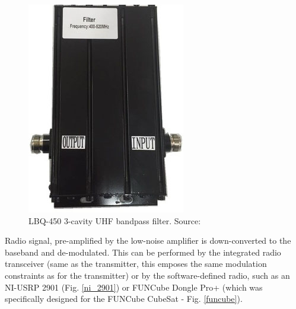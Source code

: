 \begin{minipage}{\linewidth}
\begin{minipage}{0.45\linewidth}
\begin{figure}[H]
            \includegraphics[width=0.2\paperwidth]{img/2/cavity_uhf.jpg}
            \caption{LBQ-450 3-cavity UHF bandpass filter. Source: \cite{cavity_uhf}}
            \label{cavity_uhf}
        \end{figure}
    \end{minipage}
\end{minipage}

Radio signal, pre-amplified by the low-noise amplifier is down-converted to the baseband and de-modulated. This can be performed by the integrated radio transceiver (same as the transmitter, this emposes the same modulation constraints as for the transmitter) or by the software-defined radio, such as an NI-USRP 2901 (Fig. \ref{ni_2901}) or FUNCube Dongle Pro+ (which was specifically designed for the FUNCube CubeSat - Fig. \ref{funcube}).


